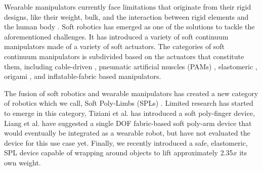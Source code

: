 \documentclass[letterpaper, 10 pt, conference]{ieeeconf}  %
\begin{document}
Wearable manipulators currently face limitations that originate from their rigid designs, like their weight, bulk, and the interaction between rigid elements and the human body \cite{delAma2012}. Soft robotics has emerged as one of the solutions to tackle the aforementioned challenges. It has introduced a variety of soft continuum manipulators made of a variety of soft actuators. The categories of soft continuum manipulators is subdivided based on the actuators that constitute them, including cable-driven \cite{mcMahan2005,calisti2011}, pneumatic artificial muscles (PAMs) \cite{walker2005,godage2016,yasmin2017,giannaccini2017}, elastomeric \cite{cianchetti2013,marchese2015,robertson2017,gong2018}, origami \cite{santoso2017}, and inflatable-fabric \cite{sanan2013,hawkes2017,ohta2017,best2016,liang2018,takeichi2017,kim2018,liang2017c} based manipulators. 
% 
% 

The fusion of soft robotics and wearable manipulators has created a new category of robotics which we call, Soft Poly-Limbs (SPLs) \cite{nguyen2018}. Limited research has started to emerge in this category, Tiziani et al. \cite{tiziani2017} has introduced a soft poly-finger device, Liang et al. \cite{liang2017c} have suggested a single DOF fabric-based soft poly-arm device that would eventually be integrated as a wearable robot, but have not evaluated the device for this use case yet. Finally, we recently introduced a safe, elastomeric, SPL device \cite{nguyen2018} capable of wrapping around objects to lift approximately 2.35$x$ its own weight. 
% 
% 
% 
%
% 
% 
% 
\end{document}
